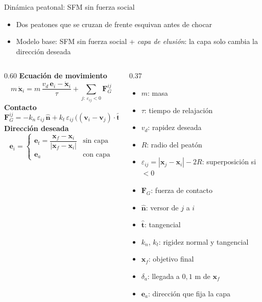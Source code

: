 \documentclass[aspectratio=43,11pt]{beamer}
\begin{document}
\begin{frame}{Dinámica peatonal: SFM sin fuerza social}
  \setlength{\abovedisplayskip}{2pt}\setlength{\belowdisplayskip}{2pt}
  \begin{itemize}\small
    \item Dos peatones que se cruzan de frente esquivan antes de chocar
    \item Modelo base: SFM sin fuerza social + \emph{capa de elusión}: la capa solo cambia la dirección deseada
  \end{itemize}
  \begin{columns}[T,onlytextwidth]
    \begin{column}{0.60\textwidth}
      {\small\textbf{Ecuación de movimiento}}
      \[ m\,\ddot{\mathbf{x}}_i = m\,\frac{v_d\,\mathbf{e}_i - \dot{\mathbf{x}}_i}{\tau} + \sum_{j:\,\varepsilon_{ij}<0} \mathbf{F}_G^{ij} \]
      {\small\textbf{Contacto}}
      \[ \mathbf{F}_G^{ij} = -k_n\,\varepsilon_{ij}\,\hat{\mathbf{n}} + k_t\,\varepsilon_{ij}\,\big((\mathbf{v}_i - \mathbf{v}_j)\cdot\hat{\mathbf{t}}\big)\,\hat{\mathbf{t}} \]
      {\small\textbf{Dirección deseada}}
      \[ \mathbf{e}_i = \begin{cases} \mathbf{e}_t = \dfrac{\mathbf{x}_f - \mathbf{x}_i}{|\mathbf{x}_f - \mathbf{x}_i|} & \text{sin capa} \\[2mm] \mathbf{e}_a & \text{con capa} \end{cases} \]
    \end{column}
    \begin{column}{0.37\textwidth}
      \begin{itemize}\footnotesize\setlength{\itemsep}{-0.3pt}
        \item $m$: masa
        \item $\tau$: tiempo de relajación
        \item $v_d$: rapidez deseada
        \item $R$: radio del peatón
        \item $\varepsilon_{ij} = |\mathbf{x}_j - \mathbf{x}_i| - 2R$: superposición si $< 0$
        \item $\mathbf{F}_G$: fuerza de contacto
        \item $\hat{\mathbf{n}}$: versor de $j$ a $i$
        \item $\hat{\mathbf{t}}$: tangencial
        \item $k_n$, $k_t$: rigidez normal y tangencial
        \item $\mathbf{x}_f$: objetivo final
        \item $\delta_a$: llegada a $0{,}1$ m de $\mathbf{x}_f$
        \item $\mathbf{e}_a$: dirección que fija la capa
      \end{itemize}
    \end{column}
  \end{columns}
\end{frame}
\end{document}
